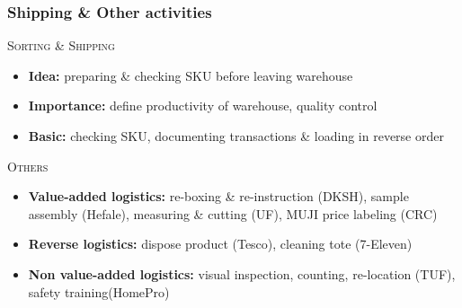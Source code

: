 \documentclass[10pt,handout,notes=show]{beamer}
\begin{document}
\begin{frame}
  \frametitle{Shipping \& Other activities}

  \textsc{Sorting \&  Shipping}
  \begin{itemize}
    \item \textbf{Idea:} preparing \& checking SKU before leaving warehouse
    \item \textbf{Importance:} define productivity of warehouse, \alert{quality control}
    \item \textbf{Basic:} checking SKU, documenting transactions \& loading in reverse order
  \end{itemize}

  \NextHalfLine
  \textsc{Others}
  \begin{itemize}
    \item \textbf{Value-added logistics:} re-boxing \& re-instruction (DKSH), sample assembly (Hefale), measuring \& cutting (UF), MUJI price labeling (CRC)
    \item \textbf{Reverse logistics:} dispose product (Tesco), cleaning tote (7-Eleven)
    \item \textbf{Non value-added logistics:}  visual inspection, counting, re-location (TUF), safety training(HomePro)
  \end{itemize}

\end{frame}

\end{document}
